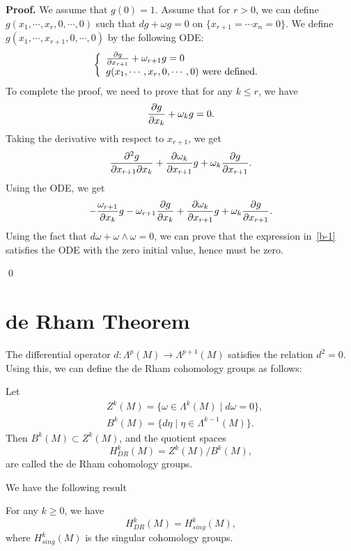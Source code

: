 {\bf Proof.} We assume that $g(0)=1$. Assume that for $r>0$, we can define $g(x_1,\cdots,x_r,0,\cdots,0)$ such that $dg+\omega g=0$ on $\{x_{r+1}=\cdots x_n=0\}$. We define $g(x_1,\cdots, x_{r+1},0,\cdots,0)$ by the following ODE:
\[
\left\{
\begin{array}{l}
\frac{\partial g}{\partial x_{r+1}}+\omega_{r+1} g=0\\
g(x_1,\cdots,x_r,0,\cdots,0) \text{ were defined. }
\end{array}
\right.
\]
To complete the proof, we need to prove that for any $k\leq r$, we have
\begin{equation}\label{b-1}
\frac{\partial g}{\partial x_k}+\omega_k g=0.
\end{equation}
Taking the derivative  with respect to $x_{r+1}$, we get
\[
\frac{\partial ^2 g}{\partial x_{r+1}\partial x_k}+\frac{\partial\omega_k}{\partial x_{r+1}}g+\omega_k\frac{\partial g}{\partial x_{r+1}}.
\]
Using the ODE, we get
\[
-\frac{\omega_{r+1}}{\partial x_k}g-\omega_{r+1}\frac{\partial g}{\partial x_k}+\frac{\partial\omega_k}{\partial x_{r+1}}g+\omega_k\frac{\partial g}{\partial x_{r+1}}.
\]
Using the fact that $d\omega+\omega\wedge\omega=0$, we can prove that the expression in~\eqref{b-1} satisfies the ODE with the zero initial value, hence must be zero.

\qed












\section{de Rham Theorem}

The differential operator $d:\Lambda^p(M)\to\Lambda^{p+1}(M)$ satisfies the relation $d^2=0$. Using this, we can define the de Rham cohomology groups as follows:

\begin{definition}
Let
\begin{align*}
& Z^k(M)=\{\omega\in\Lambda^k(M)\mid d\omega=0\},\\
&B^k(M)=\{d\eta\mid \eta\in\Lambda^{k-1}(M)\}.
\end{align*}
Then $B^k(M)\subset Z^k(M)$, and the quotient spaces
\[
H_{DR}^k(M)=Z^k(M)/B^k(M),
\]
are called the de Rham cohomology groups.
\end{definition}


We have the following result
\begin{theorem}[de Rham] For any 
$k\geq 0$, we have
\[
H_{DR}^k(M)=H_{sing}^k(M),
\]
where $H_{sing}^k(M)$ is the singular cohomology groups.
\end{theorem}

